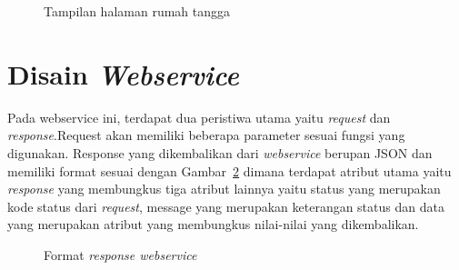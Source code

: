 \begin{figure}
\centering
{}
\caption[Tampilan halaman rumah tangga]{Tampilan halaman rumah tangga} 
\label{fig:design_web_index_rumah_tangga}
\end{figure}

\section{Disain \textit{Webservice}}

\hspace{0,5cm}Pada webservice ini, terdapat dua peristiwa utama yaitu \textit{request} dan \textit{response}.Request akan memiliki beberapa parameter sesuai fungsi yang digunakan. Response yang dikembalikan dari \textit{webservice} berupan JSON dan memiliki format sesuai dengan Gambar~\ref{fig:format_response_webservice} dimana terdapat atribut utama yaitu \textit{response} yang membungkus tiga atribut lainnya yaitu status yang merupakan kode status dari \textit{request}, message yang merupakan keterangan status dan data yang merupakan atribut yang membungkus nilai-nilai yang dikembalikan.

\begin{figure}
\centering
{}
\caption[Format \textit{response webservice}]{Format \textit{response webservice}} 
\label{fig:format_response_webservice}
\end{figure}

